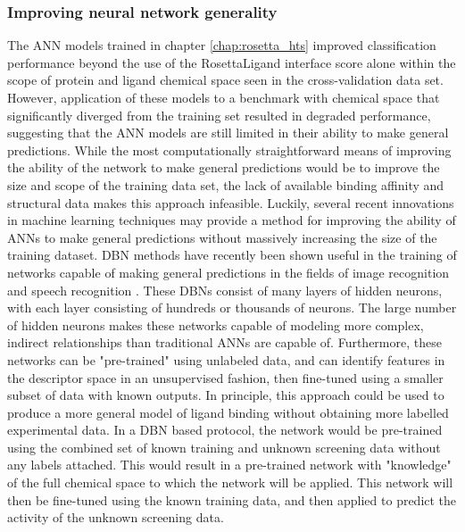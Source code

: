 \subsubsection{Improving neural network generality}
The ANN models trained in chapter \ref{chap:rosetta_hts} improved classification performance beyond the use of the RosettaLigand interface score alone within the scope of protein and ligand chemical space seen in the cross-validation data set.
However, application of these models to a benchmark with chemical space that significantly diverged from the training set resulted in degraded performance, suggesting that the \ac{ANN} models are still limited in their ability to make general predictions.
While the most computationally straightforward means of improving the ability of the network to make general predictions would be to improve the size and scope of the training data set, the lack of available binding affinity and structural data makes this approach infeasible. 
Luckily, several recent innovations in machine learning techniques may provide a method for improving the ability of \ac{ANN}s to make general predictions without massively increasing the size of the training dataset.
\ac{DBN} methods \citep{Hinton:2006dy} have recently been shown useful in the training of networks capable of making general predictions in the fields of image recognition \citep{Le:2013kz,Bengio:2009kb} and speech recognition \citep{Heigold:2013us}.
These \ac{DBN}s consist of many layers of hidden neurons, with each layer consisting of hundreds or thousands of neurons.
The large number of hidden neurons makes these networks capable of modeling more complex, indirect relationships than traditional \ac{ANN}s are capable of.
Furthermore, these networks can be "pre-trained" using unlabeled data, and can identify features in the descriptor space in an unsupervised fashion, then fine-tuned using a smaller subset of data with known outputs.
In principle, this approach could be used to produce a more general model of ligand binding without obtaining more labelled experimental data.
In a \ac{DBN} based protocol, the network would be pre-trained using the combined set of known training and unknown screening data without any labels attached.
This would result in a pre-trained network with "knowledge" of the full chemical space to which the network will be applied.
This network will then be fine-tuned using the known training data, and then applied to predict the activity of the unknown screening data.

